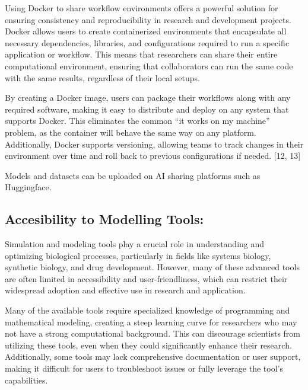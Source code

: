 \documentclass[
  letterpaper,
]{book}
\begin{document}
Using Docker to share workflow environments offers a powerful solution
for ensuring consistency and reproducibility in research and development
projects. Docker allows users to create containerized environments that
encapsulate all necessary dependencies, libraries, and configurations
required to run a specific application or workflow. This means that
researchers can share their entire computational environment, ensuring
that collaborators can run the same code with the same results,
regardless of their local setups.

By creating a Docker image, users can package their workflows along with
any required software, making it easy to distribute and deploy on any
system that supports Docker. This eliminates the common ``it works on my
machine'' problem, as the container will behave the same way on any
platform. Additionally, Docker supports versioning, allowing teams to
track changes in their environment over time and roll back to previous
configurations if needed. {[}12, 13{]}

Models and datasets can be uploaded on AI sharing platforms such as
Huggingface.

\subsection{Accesibility to Modelling
Tools:}\label{accesibility-to-modelling-tools}

Simulation and modeling tools play a crucial role in understanding and
optimizing biological processes, particularly in fields like systems
biology, synthetic biology, and drug development. However, many of these
advanced tools are often limited in accessibility and user-friendliness,
which can restrict their widespread adoption and effective use in
research and application.

Many of the available tools require specialized knowledge of programming
and mathematical modeling, creating a steep learning curve for
researchers who may not have a strong computational background. This can
discourage scientists from utilizing these tools, even when they could
significantly enhance their research. Additionally, some tools may lack
comprehensive documentation or user support, making it difficult for
users to troubleshoot issues or fully leverage the tool's capabilities.
\end{document}
